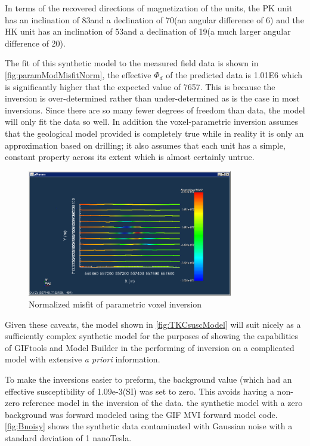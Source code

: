 In terms of the recovered directions of magnetization of the units, the PK unit has an inclination of 83\degree and a declination of 70\degree (an angular difference of 6\degree) and the HK unit has an inclination of 53\degree and a declination of 19\degree (a much larger angular difference of 20\degree).


The fit of this synthetic model to the measured field data is shown in  \autoref{fig:paramModMisfitNorm}, the effective $\Phi_d$ of the predicted data is 
1.01E6 which is significantly higher that the expected value of 7657. This is because the inversion is over-determined rather than under-determined as is the case in most inversions. Since there are so many fewer degrees of freedom than data, the model will only fit the data so well. In addition the voxel-parametric inversion assumes that the geological model provided is completely true while in reality it is only an approximation based on drilling; it also assumes that each unit has a simple, constant property across its extent which is almost certainly untrue.

\begin{figure} [h]
   \centering
   \includegraphics[width=0.8\textwidth]{images/TKC/paramModMisfitNorm.PNG}
   \caption{Normalized misfit of parametric voxel inversion}
   \label{fig:paramModMisfitNorm}
\end{figure}

Given these caveats, the model shown in \autoref{fig:TKCsuscModel} will suit nicely as a sufficiently complex synthetic model for the purposes of showing the capabilities of GIFtools and Model Builder in the performing of inversion on a complicated model with extensive \emph{a priori} information.

To make the inversions easier to preform, the background value (which had an effective susceptibility of 1.09e-3(SI) was set to zero. This avoids having a non-zero reference model in the inversion of the data. the synthetic model with a zero background was forward modeled using the \ac{GIF} \ac{MVI} forward model code. \autoref{fig:Bnoisy} shows the synthetic data contaminated with Gaussian noise with a standard deviation of 1 nanoTesla.

